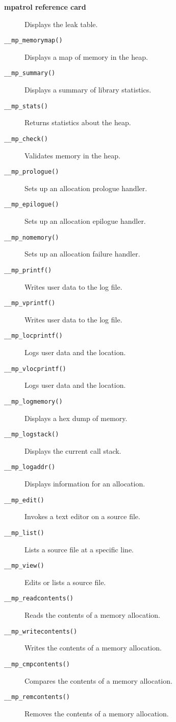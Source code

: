 \documentclass[a4paper,landscape,final]{article}
\newcommand{\function}[1]{\texttt{#1()}}
\begin{document}
\begin{multicols}{3}{\textbf{\Large mpatrol reference card}}
\begin{description}
\hfill Displays the leak table.
\item[\function{\_\_mp\_memorymap}]
\hfill Displays a map of memory in the heap.
\item[\function{\_\_mp\_summary}]
\hfill Displays a summary of library statistics.
\item[\function{\_\_mp\_stats}]
\hfill Returns statistics about the heap.
\item[\function{\_\_mp\_check}]
\hfill Validates memory in the heap.
\item[\function{\_\_mp\_prologue}]
\hfill Sets up an allocation prologue handler.
\item[\function{\_\_mp\_epilogue}]
\hfill Sets up an allocation epilogue handler.
\item[\function{\_\_mp\_nomemory}]
\hfill Sets up an allocation failure handler.
\item[\function{\_\_mp\_printf}]
\hfill Writes user data to the log file.
\item[\function{\_\_mp\_vprintf}]
\hfill Writes user data to the log file.
\item[\function{\_\_mp\_locprintf}]
\hfill Logs user data and the location.
\item[\function{\_\_mp\_vlocprintf}]
\hfill Logs user data and the location.
\item[\function{\_\_mp\_logmemory}]
\hfill Displays a hex dump of memory.
\item[\function{\_\_mp\_logstack}]
\hfill Displays the current call stack.
\item[\function{\_\_mp\_logaddr}]
\hfill Displays information for an allocation.
\item[\function{\_\_mp\_edit}]
\hfill Invokes a text editor on a source file.
\item[\function{\_\_mp\_list}]
\hfill Lists a source file at a specific line.
\item[\function{\_\_mp\_view}]
\hfill Edits or lists a source file.
\item[\function{\_\_mp\_readcontents}]
\hfill Reads the contents of a memory allocation.
\item[\function{\_\_mp\_writecontents}]
\hfill Writes the contents of a memory allocation.
\item[\function{\_\_mp\_cmpcontents}]
\hfill Compares the contents of a memory allocation.
\item[\function{\_\_mp\_remcontents}]
\hfill Removes the contents of a memory allocation.
\end{description}


\end{multicols}
\end{document}
